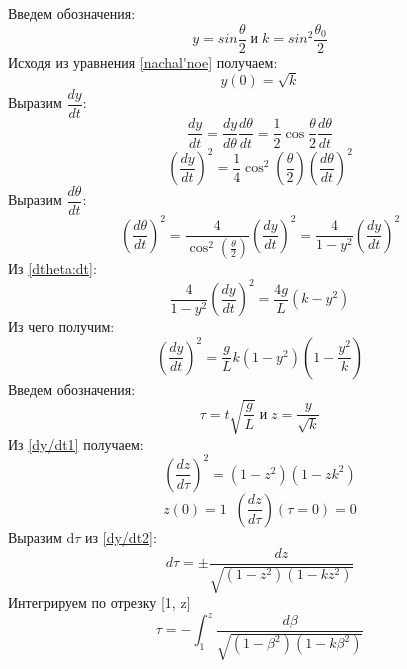 \documentclass[a4paper,12pt]{article}
\begin{document}
Введем обозначения:
\begin{equation}
    y = sin{\frac{\theta}{2}} \;\text{и}\; k = sin^2{\frac{\theta_0}{2}}
\end{equation}
Исходя из уравнения \eqref{nachal'noe} получаем:
\begin{equation}
    y(0) = \sqrt{k}
\end{equation}
Выразим $\dfrac{dy}{dt}$:
\begin{equation}
    \dfrac{dy}{dt} = \dfrac{dy}{d\theta}\dfrac{d\theta}{dt} =
    \dfrac{1}{2}\cos{\dfrac{\theta}{2}}\dfrac{d\theta}{dt}
\end{equation}
\begin{equation}
    \left(\dfrac{dy}{dt}\right)^2 = 
    \dfrac{1}{4}\cos^2\left({\dfrac{\theta}{2}}\right)\left(\dfrac{d\theta}{dt}\right)^2
\end{equation}
Выразим $\dfrac{d\theta}{dt}$:
\begin{equation}
    \left(\dfrac{d\theta}{dt}\right)^2 = 
    \frac{4}{\cos^{2}\left({\frac{\theta}{2}}\right)}\left(\dfrac{dy}{dt}\right)^2 =
    \frac{4}{1-y^2}\left(\dfrac{dy}{dt}\right)^2
\end{equation}
Из \eqref{dtheta:dt}:
\begin{equation}
    \frac{4}{1-y^2}\left(\dfrac{dy}{dt}\right)^2 = 
    \frac{4g}{L}\left(k - y^2\right)
\end{equation}
Из чего получим:
\begin{equation}\label{dy/dt1}
    \left(\dfrac{dy}{dt}\right)^{2} =
    \dfrac{g}{L}k\left(1 - y^2\right)\left(1 - \dfrac{y^2}{k}\right)
\end{equation}
Введем обозначения:
\begin{equation}
    \tau = t\sqrt{\frac{g}{L}} \;\text{и}\; 
    z = \frac{y}{\sqrt{k}}
\end{equation}
Из \eqref{dy/dt1} получаем:
\begin{equation}\label{dy/dt2}
    \left(\frac{dz}{d\tau}\right)^2 = 
    (1 - z^2)(1 - zk^2)
\end{equation}
\begin{equation}
    z(0) = 1  \;\; \left(\frac{dz}{d\tau}\right)(\tau = 0) = 0
\end{equation}
Выразим d$\tau$ из \eqref{dy/dt2}:
\begin{equation}
    d\tau = \pm\dfrac{dz}{\sqrt{(1-z^2)(1-kz^2)}}
\end{equation}
Интегрируем по отрезку [1, z]
\begin{equation}\label{beta}
    \tau =
    - \int_{1}^{z}\dfrac{d\beta}{\sqrt{(1-\beta^2)(1-k\beta^2)}}
\end{equation}
\end{document}

